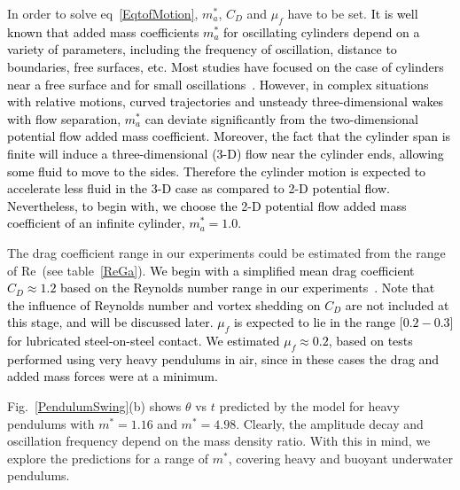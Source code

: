\documentclass{jfm}
\begin{document}
In order to solve eq~\ref{EqtofMotion}, $m_a^*$, $C_D$ and $\mu_f$ have to be set. \textcolor{black}{It is well known that added mass coefficients $m_a^*$ for oscillating cylinders depend on a variety of parameters, including the frequency of oscillation,  distance to boundaries, free surfaces, etc. Most studies have focused on the case of cylinders near a free surface and for small oscillations~\citep{dong1978effective,konstantinidis2013added,koo2015simplified,tatsuno1990visual,mathai2017mass,mathai2018flutter}. However, in complex situations with relative motions, curved trajectories and unsteady three-dimensional wakes with flow separation, $m_a^*$  can deviate significantly from the two-dimensional potential flow added mass coefficient. Moreover, the fact that the cylinder span is finite will induce a three-dimensional (3-D) flow near the cylinder ends, allowing some fluid to move to the sides. %
Therefore the cylinder motion is expected to accelerate less fluid in the 3-D case as compared to 2-D potential flow. Nevertheless, to begin with, we choose the 2-D potential flow added mass coefficient of an infinite cylinder, $m_a^* =1.0$.}



The drag coefficient range in our experiments could be estimated from  the range of Re~(see table~\ref{ReGa}). 
\textcolor{black}{{We begin with a simplified mean drag coefficient $C_D \approx 1.2$ based on the Reynolds number range in our experiments~\citep{lienhard1966synopsis}. Note that the influence of Reynolds number and vortex shedding on $C_D$ are not included at this stage, and will be discussed later.} $\mu_f$ is expected to lie in the range [$0.2 -0.3$] for lubricated steel-on-steel contact. We estimated $\mu_f \approx 0.2$, based on tests performed using very heavy pendulums in air, since in these cases the drag and added mass forces were at a minimum.}

	Fig.~\ref{PendulumSwing}(b) shows $\theta$ vs $t$ predicted by the model for heavy pendulums with $m^* = 1.16$ and $m^* =4.98$.
	Clearly, the amplitude decay and oscillation frequency depend on the mass density ratio. With this in mind, we explore the predictions for a range of $m^*$, covering  heavy and buoyant underwater  pendulums.
	
\end{document}
